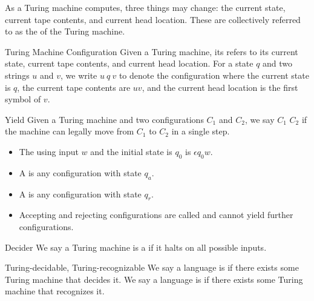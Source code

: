 As a Turing machine computes, three things may change: the current state, current tape contents, and current head location. These are collectively referred to as the  of the Turing machine.

\begin{dfnbox}{Turing Machine Configuration}{}
    Given a Turing machine, its  refers to its current state, current tape contents, and current head location. For a state $q$ and two strings $u$ and $v$, we write $u\ q\ v$ to denote the configuration where the current state is $q$, the current tape contents are $uv$, and the current head location is the first symbol of $v$.
\end{dfnbox}

\begin{dfnbox}{Yield}{}
    Given a Turing machine and two configurations $C_1$ and $C_2$, we say $C_1$  $C_2$ if the machine can legally move from $C_1$ to $C_2$ in a single step.
\end{dfnbox}

\begin{itemize}
    \item The  using input $w$ and the initial state is $q_0$ is $\epsilon q_0w$.
    \item A  is any configuration with state $q_a$.
    \item A  is any configuration with state $q_r$.
    \item Accepting and rejecting configurations are called  and cannot yield further configurations.
\end{itemize}

\begin{dfnbox}{Decider}{}
    We say a Turing machine is a  if it halts on all possible inputs.
\end{dfnbox}

\begin{dfnbox}{Turing-decidable, Turing-recognizable}{}
    We say a language is  if there exists some Turing machine that decides it. We say a language is  if there exists some Turing machine that recognizes it.
\end{dfnbox}
